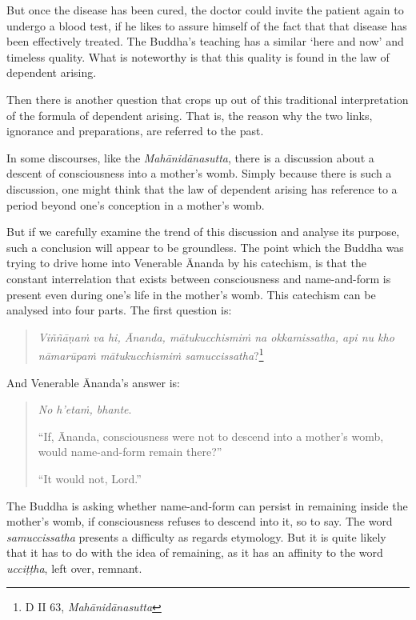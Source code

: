 But once the disease has been cured, the doctor could invite the patient again to undergo a blood test, if he likes to assure himself of the fact that that disease has been effectively treated. The Buddha's teaching has a similar `here and now' and timeless quality. What is noteworthy is that this quality is found in the law of dependent arising.

Then there is another question that crops up out of this traditional interpretation of the formula of dependent arising. That is, the reason why the two links, ignorance and preparations, are referred to the past.

In some discourses, like the \emph{Mahānidānasutta}, there is a discussion about a descent of consciousness into a mother's womb. Simply because there is such a discussion, one might think that the law of dependent arising has reference to a period beyond one's conception in a mother's womb.

But if we carefully examine the trend of this discussion and analyse its purpose, such a conclusion will appear to be groundless. The point which the Buddha was trying to drive home into Venerable Ānanda by his catechism, is that the constant interrelation that exists between consciousness and name-and-form is present even during one's life in the mother's womb. This catechism can be analysed into four parts. The first question is:

\begin{quote}
\emph{Viññāṇaṁ va hi, Ānanda, mātukucchismiṁ na okkamissatha, api nu kho nāmarūpaṁ mātukucchismiṁ samuccissatha}?\footnote{D II 63, \emph{Mahānidānasutta}}
\end{quote}

And Venerable Ānanda's answer is:

\begin{quote}
\emph{No h'etaṁ, bhante}.

``If, Ānanda, consciousness were not to descend into a mother's womb, would name-and-form remain there?''

``It would not, Lord.''
\end{quote}

The Buddha is asking whether name-and-form can persist in remaining inside the mother's womb, if consciousness refuses to descend into it, so to say. The word \emph{samuccissatha} presents a difficulty as regards etymology. But it is quite likely that it has to do with the idea of remaining, as it has an affinity to the word \emph{ucciṭṭha}, left over, remnant.

